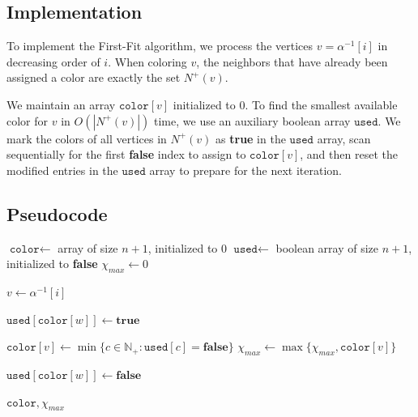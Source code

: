 \subsection{Implementation}
To implement the First-Fit algorithm, we process the vertices $v = \alpha^{-1}[i]$ in decreasing order of $i$. When coloring $v$, the neighbors that have already been assigned a color are exactly the set $N^+(v)$. 

We maintain an array $\texttt{color}[v]$ initialized to $0$. To find the smallest available color for $v$ in $O(|N^+(v)|)$ time, we use an auxiliary boolean array $\texttt{used}$. We mark the colors of all vertices in $N^+(v)$ as \textbf{true} in the $\texttt{used}$ array, scan sequentially for the first \textbf{false} index to assign to $\texttt{color}[v]$, and then reset the modified entries in the $\texttt{used}$ array to prepare for the next iteration.

\subsection{Pseudocode}

\begin{algorithm}[H]
\caption{Minimum Vertex Coloring}
\begin{algorithmic}[1]
    \State $\texttt{color} \gets$ array of size $n+1$, initialized to $0$
    \State $\texttt{used} \gets$ boolean array of size $n+1$, initialized to \textbf{false}
    \State $\chi_{max} \gets 0$
    
        \State $v \gets \alpha^{-1}[i]$
        
            \If{$\alpha[v] < \alpha[w]$}
                \State $\texttt{used}[\texttt{color}[w]] \gets \textbf{true}$
            \EndIf
        \EndFor
        
        \State $\texttt{color}[v] \gets \min\{c\in\mathbb{N}_+ : \texttt{used}[c] = \textbf{false}\}$
        \State $\chi_{max} \gets \max\{\chi_{max}, \texttt{color}[v]\}$

         
            \If{$\alpha[v] < \alpha[w]$}
                \State $\texttt{used}[\texttt{color}[w]] \gets \textbf{false}$
            \EndIf
        \EndFor
    \EndFor
    
    \State \Return $\texttt{color}, \chi_{max}$
\EndFunction
\end{algorithmic}
\end{algorithm}


